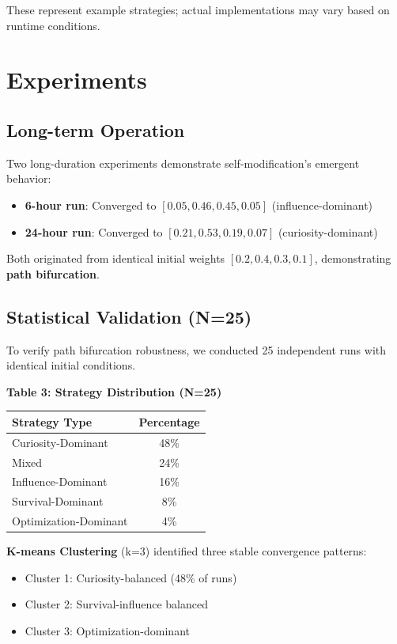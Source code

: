 \documentclass{article}
\begin{document}
These represent example strategies; actual implementations may vary based on runtime conditions.

\section{Experiments}

\subsection{Long-term Operation}
Two long-duration experiments demonstrate self-modification's emergent behavior:

\begin{itemize}
    \item \textbf{6-hour run}: Converged to $[0.05, 0.46, 0.45, 0.05]$ (influence-dominant)
    \item \textbf{24-hour run}: Converged to $[0.21, 0.53, 0.19, 0.07]$ (curiosity-dominant)
\end{itemize}

Both originated from identical initial weights $[0.2, 0.4, 0.3, 0.1]$, demonstrating \textbf{path bifurcation}.

\subsection{Statistical Validation (N=25)}
To verify path bifurcation robustness, we conducted 25 independent runs with identical initial conditions.

\textbf{Table 3: Strategy Distribution (N=25)}
\begin{center}
\begin{tabular}{lc}
\toprule
\textbf{Strategy Type} & \textbf{Percentage} \\
\midrule
Curiosity-Dominant & 48\% \\
Mixed & 24\% \\
Influence-Dominant & 16\% \\
Survival-Dominant & 8\% \\
Optimization-Dominant & 4\% \\
\bottomrule
\end{tabular}
\end{center}

\textbf{K-means Clustering} (k=3) identified three stable convergence patterns:
\begin{itemize}
    \item Cluster 1: Curiosity-balanced (48\% of runs)
    \item Cluster 2: Survival-influence balanced
    \item Cluster 3: Optimization-dominant
\end{itemize}
\end{document}
